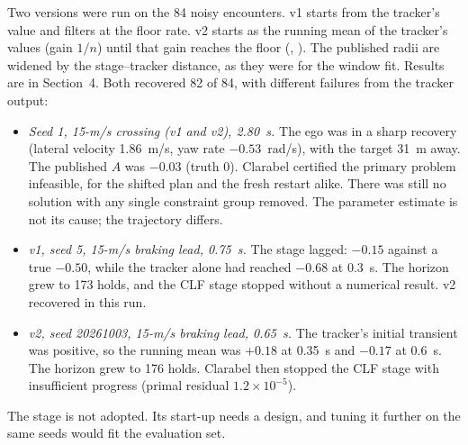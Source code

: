 \documentclass[11pt]{article}
\begin{document}
Two versions were run on the 84 noisy encounters. v1 starts from the
tracker's value and filters at the floor rate. v2 starts as the running mean
of the tracker's values (gain $1/n$) until that gain reaches the floor
(, ). The published radii
are widened by the stage--tracker distance, as they were for the window fit.
Results are in Section~4. Both recovered 82 of 84, with different failures
from the tracker output:
\begin{itemize}
\item \emph{Seed 1, 15-m/s crossing (v1 and v2), 2.80~s.} The ego was in a
  sharp recovery (lateral velocity 1.86~m/s, yaw rate $-0.53$~rad/s), with
  the target 31~m away. The published $A$ was $-0.03$ (truth 0). Clarabel
  certified the primary problem infeasible, for the shifted plan and the
  fresh restart alike. There was still no solution with any single
  constraint group removed. The parameter estimate is not its cause; the
  trajectory differs.
\item \emph{v1, seed 5, 15-m/s braking lead, 0.75~s.} The stage lagged: $-0.15$
  against a true $-0.50$, while the tracker alone had reached $-0.68$ at
  0.3~s. The horizon grew to 173 holds, and the CLF stage stopped without a
  numerical result. v2 recovered in this run.
\item \emph{v2, seed 20261003, 15-m/s braking lead, 0.65~s.} The tracker's
  initial transient was positive, so the running mean was $+0.18$ at 0.35~s
  and $-0.17$ at 0.6~s. The horizon grew to 176 holds. Clarabel then stopped the CLF stage
  with insufficient progress (primal residual $1.2\times10^{-5}$).
\end{itemize}
The stage is not adopted. Its start-up needs a design, and tuning it further
on the same seeds would fit the evaluation set.
\end{document}
